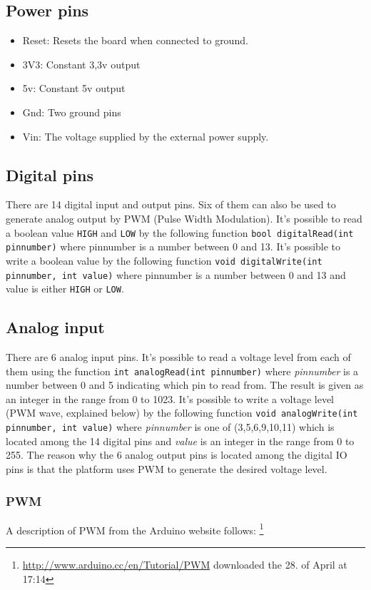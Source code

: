 \documentclass[a4paper, oneside, final]{memoir}
\begin{document}
\subsection{Power pins}
\begin{itemize}
\item Reset: Resets the board when connected to ground.
\item 3V3: Constant 3,3v output
\item 5v: Constant 5v output
\item Gnd: Two ground pins
\item Vin: The voltage supplied by the external power supply.
\end{itemize}

\subsection{Digital pins}

There are 14 digital input and output pins. Six of them can also be
used to generate analog output by PWM (Pulse Width Modulation). It's
possible to read a boolean value \texttt{HIGH} and \texttt{LOW} by the
following function \texttt{bool digitalRead(int pinnumber)} where
pinnumber is a number between 0 and 13. It's possible to write a
boolean value by the following function \texttt{void digitalWrite(int
  pinnumber, int value)} where pinnumber is a number between 0 and 13
and value is either \texttt{HIGH} or \texttt{LOW}.

\subsection{Analog input}
There are 6 analog input pins. It's possible to read a voltage level
from each of them using the function \texttt{int analogRead(int
  pinnumber)} where \textit{pinnumber} is a number between 0 and 5
indicating which pin to read from. The result is given as an integer
in the range from 0 to 1023. It's possible to write a voltage level
(PWM wave, explained below) by the following function \texttt{void
  analogWrite(int pinnumber, int value)} where \textit{pinnumber} is
one of (3,5,6,9,10,11) which is located among the 14 digital pins and
\textit{value} is an integer in the range from 0 to 255. The reason
why the 6 analog output pins is located among the digital IO pins is
that the platform uses PWM to generate the desired voltage level.

\subsubsection{PWM}
\label{sec:pwm}
A description of PWM from the Arduino website follows:
\footnote{\url{http://www.arduino.cc/en/Tutorial/PWM} downloaded the
  28. of April at 17:14}
\end{document}
